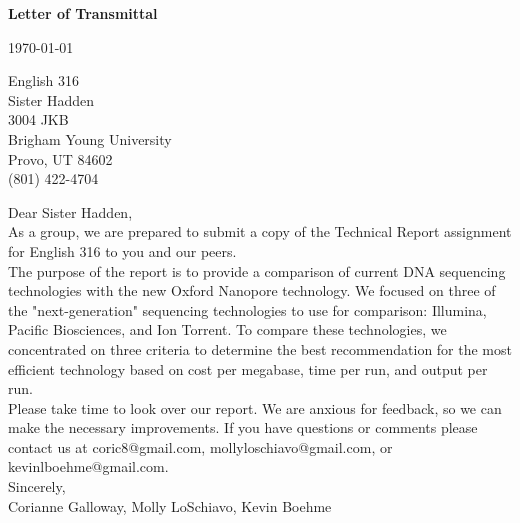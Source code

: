 \documentclass[12pt,letterpaper]{report}
\renewcommand{\thepage}{\roman{page}}%
\begin{document}
\begin{center}
\Huge\textbf{Letter of Transmittal}
\end{center}
\begin{flushleft}
\today \\[1\baselineskip]
\begin{singlespace}
English 316 \\
Sister Hadden \\
3004 JKB \\
Brigham Young University \\
Provo, UT 84602 \\
(801) 422-4704 \\[1\baselineskip]
\end{singlespace}
Dear Sister Hadden, \\[1\baselineskip]
As a group, we are prepared to submit a copy of the Technical Report assignment for English 316 to you and our peers.\\ [1\baselineskip]
The purpose of the report is to provide a comparison of current DNA sequencing technologies with the new Oxford Nanopore technology. We focused on three of the "next-generation" sequencing technologies to use for comparison: Illumina, Pacific Biosciences, and Ion Torrent. To compare these technologies, we concentrated on three criteria to determine the best recommendation for the most efficient technology based on cost per megabase, time per run, and output per run. \\[1\baselineskip]
Please take time to look over our report. We are anxious for feedback, so we can make the necessary improvements. If you have questions or comments please contact us at coric8@gmail.com, mollyloschiavo@gmail.com, or kevinlboehme@gmail.com. \\ [1\baselineskip]
Sincerely,\\[1\baselineskip]
Corianne Galloway, Molly LoSchiavo, Kevin Boehme
\end{flushleft}

\clearpage


\renewcommand*\contentsname{Table of Contents}
\setcounter{page}{3}
\renewcommand{\thepage}{\roman{page}}%
\tableofcontents
\clearpage
\end{document}
